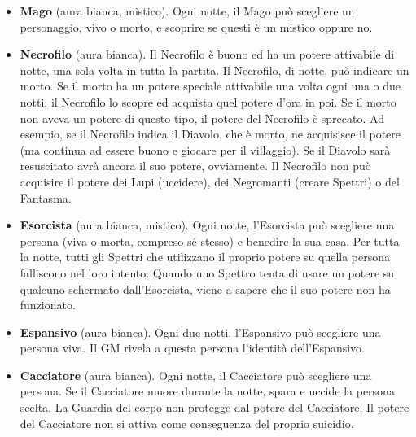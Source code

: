 \documentclass[a4paper,10pt]{article}
\begin{document}
\begin{itemize}
 \item {\bf Mago} (aura bianca, mistico). Ogni notte, il Mago può scegliere un personaggio, vivo o morto, e scoprire se questi è un mistico oppure no.
 

 \item {\bf Necrofilo} (aura bianca). Il Necrofilo è buono ed ha un potere attivabile di notte, una sola volta in tutta la partita.
 Il Necrofilo, di notte, può indicare un morto. Se il morto ha un potere speciale attivabile una volta ogni una o due notti, il Necrofilo lo scopre ed acquista quel potere d'ora in poi. Se il morto non aveva un potere di questo tipo, il potere del Necrofilo è sprecato. Ad esempio, se il Necrofilo indica il Diavolo, che è morto, ne acquisisce il potere (ma continua ad essere buono e giocare per il villaggio). Se il Diavolo sarà resuscitato avrà ancora il suo potere, ovviamente.
 Il Necrofilo non può acquisire il potere dei Lupi (uccidere), dei Negromanti (creare Spettri) o del Fantasma.

 \item {\bf Esorcista} (aura bianca, mistico). Ogni notte, l'Esorcista può scegliere una persona (viva o morta, compreso sé stesso) e benedire la sua casa.
 Per tutta la notte, tutti gli Spettri che utilizzano il proprio potere su quella persona falliscono nel loro intento.
 Quando uno Spettro tenta di usare un potere su qualcuno schermato dall'Esorcista, viene a sapere che il suo potere non ha funzionato.
 


 \item {\bf Espansivo} (aura bianca). Ogni due notti, l'Espansivo può scegliere una persona viva. Il GM rivela a questa persona l'identità dell'Espansivo.

 \item {\bf Cacciatore} (aura bianca). Ogni notte, il Cacciatore può scegliere una persona. Se il Cacciatore muore durante la notte, spara e uccide la persona scelta.
 La Guardia del corpo non protegge dal potere del Cacciatore.
 Il potere del Cacciatore non si attiva come conseguenza del proprio suicidio.


\end{itemize}
\end{document}
